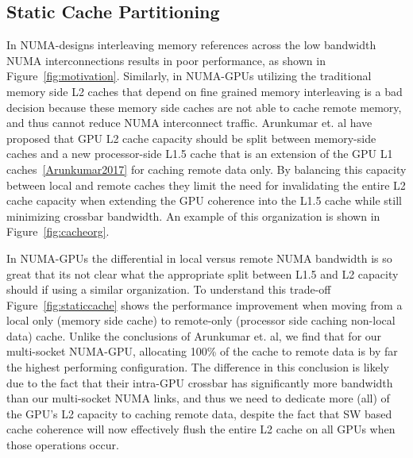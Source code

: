 \subsection{Static Cache Partitioning}
In NUMA-designs interleaving memory references across the low bandwidth NUMA
interconnections results in poor performance, as shown in Figure~\ref{fig:motivation}.
Similarly, in NUMA-GPUs utilizing the traditional memory side L2 caches that 
depend on fine grained memory interleaving is a bad decision because these memory
side caches are not able to cache remote memory, and thus cannot reduce NUMA
interconnect traffic.  Arunkumar et. al have proposed that GPU L2 cache capacity
should be split between memory-side caches and a new processor-side L1.5 cache
that is an extension of the GPU L1 caches~\ref{Arunkumar2017} for caching remote
data only.  By balancing this capacity between local and remote caches they limit the 
need for invalidating the entire L2 cache capacity when extending the GPU coherence 
into the L1.5 cache while still minimizing crossbar bandwidth.  An example of this 
organization is shown in Figure~\ref{fig:cacheorg}.

In NUMA-GPUs the differential in local versus remote NUMA bandwidth is so great
that its not clear what the appropriate split between L1.5 and L2 capacity should
if using a similar organization.  To understand this trade-off Figure~\ref{fig:staticcache}
shows the performance improvement when moving from a local only (memory side cache)
to remote-only (processor side caching non-local data) cache.  Unlike the conclusions
of Arunkumar et. al, we find that for our multi-socket NUMA-GPU, allocating
100\% of the cache to remote data is by far the highest performing configuration.
The difference in this conclusion is likely due to the fact that their intra-GPU
crossbar has significantly more bandwidth than our multi-socket NUMA links, and thus
we need to dedicate more (all) of the GPU's L2 capacity to caching remote data, despite
the fact that SW based cache coherence will now effectively flush the entire L2 cache
on all GPUs when those operations occur.

